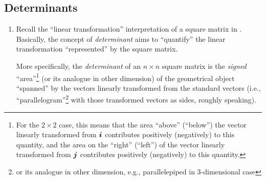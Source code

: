 \subsection{Determinants}
\begin{enumerate}
\item \label{it:deter-geo}
Recall the ``linear transformation'' interpretation of a square matrix in
. Basically, the concept of
\emph{determinant} aims to ``quantify'' the linear transformation
``represented'' by the square matrix. 

More specifically, the \emph{determinant} of an \(n\times n\) square matrix is
the \emph{signed} ``area''\footnote{For the \(2\times 2\) case, this means that
the area ``above'' (``below'') the vector linearly transformed from
\(\vb*{i}\) contributes positively (negatively) to this quantity, and the area
on the ``right'' (``left'') of the vector linearly transformed from \(\vb*{j}\)
contributes positively (negatively) to this quantity.} (or its analogue in
other dimension) of the geometrical object ``spanned'' by the vectors linearly
transformed from the standard vectors (i.e., ``parallelogram''\footnote{or its
analogue in other dimension, e.g., parallelepiped in 3-dimensional case} with
those transformed vectors as sides, roughly speaking).


\end{enumerate}
